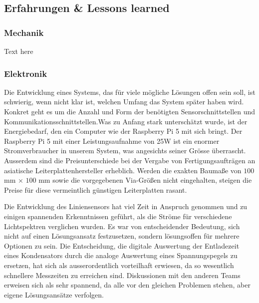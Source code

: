 \documentclass[main.tex]{subfiles} %
\begin{document}
\subsection{Erfahrungen \& Lessons learned}

\subsubsection{Mechanik}
Text here

\subsubsection{Elektronik}
Die Entwicklung eines Systems, das für viele mögliche Lösungen offen sein soll,
ist schwierig, wenn nicht klar ist, welchen Umfang das System später haben
wird. Konkret geht es um die Anzahl und Form der benötigten
Sensorschnittstellen und Kommunikationsschnittstellen.Was zu Anfang stark
unterschätzt wurde, ist der Energiebedarf, den ein Computer wie der Raspberry
Pi 5 mit sich bringt. Der Raspberry Pi 5 mit einer Leistungsaufnahme von 25W
ist ein enormer Stromverbraucher in unserem System, was angesichts seiner
Grösse überrascht. Ausserdem sind die Preisunterschiede bei der Vergabe von
Fertigungsaufträgen an asiatische Leiterplattenhersteller erheblich. Werden die
exakten Baumaße von $100$ mm × $100$ mm sowie die vorgegebenen Via-Größen nicht
eingehalten, steigen die Preise für diese vermeintlich günstigen Leiterplatten rasant.

Die Entwicklung des Liniensensors hat viel Zeit in Anspruch genommen und zu
einigen spannenden Erkenntnissen geführt, als die Ströme für verschiedene
Lichtspektren verglichen wurden. Es war von entscheidender Bedeutung, sich
nicht auf einen Lösungsansatz festzusetzen, sondern lösungsoffen für mehrere
Optionen zu sein. Die Entscheidung, die digitale Auswertung der Entladezeit
eines Kondensators durch die analoge Auswertung eines Spannungspegels zu
ersetzen, hat sich als ausserordentlich vorteilhaft erwiesen, da so wesentlich
schnellere Messzeiten zu erreichen sind. Diskussionen mit den anderen Teams
erweisen sich als sehr spannend, da alle vor den gleichen Problemen stehen,
aber eigene Lösungsansätze verfolgen.
\end{document}
